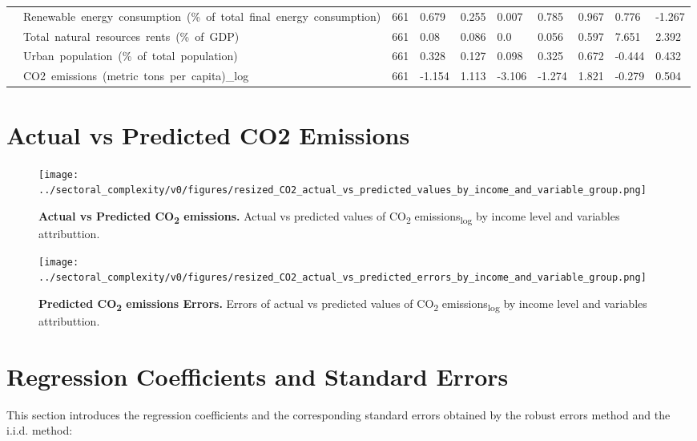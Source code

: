 \begin{appendices}
\begin{table}[H]
\begin{adjustbox}{width=\textwidth,center}
\begin{tabular}{llllllllll}
	 & Renewable\ energy\ consumption\ (\%\ of\ total\ final\ energy\ consumption) & 661 & 0.679 & 0.255 & 0.007 & 0.785 & 0.967 & 0.776 & -1.267 \\
	 & Total\ natural\ resources\ rents\ (\%\ of\ GDP) & 661 & 0.08 & 0.086 & 0.0 & 0.056 & 0.597 & 7.651 & 2.392 \\
	 & Urban\ population\ (\%\ of\ total\ population) & 661 & 0.328 & 0.127 & 0.098 & 0.325 & 0.672 & -0.444 & 0.432 \\
	 & CO2\ emissions\ (metric\ tons\ per\ capita)\_log & 661 & -1.154 & 1.113 & -3.106 & -1.274 & 1.821 & -0.279 & 0.504 \\
	\cline{1-10}
	\bottomrule
	\end{tabular}
	\end{adjustbox}
\end{table}

\newpage

\section{Actual vs Predicted CO2 Emissions}
\label{annex:actual-vs-predicted}

\begin{figure}[H]
	\centering
	\texttt{[image: ../sectoral\_complexity/v0/figures/resized\_CO2\_actual\_vs\_predicted\_values\_by\_income\_and\_variable\_group.png]}
	\caption{\textbf{Actual vs Predicted CO\textsubscript{2} emissions.} Actual vs predicted values of CO\textsubscript{2} emissions\textsubscript{log} by income level and variables attributtion.}
	\label{fig:actual-vs-predicted}
\end{figure}

\begin{figure}[H]
	\centering
	\texttt{[image: ../sectoral\_complexity/v0/figures/resized\_CO2\_actual\_vs\_predicted\_errors\_by\_income\_and\_variable\_group.png]}
	\caption{\textbf{Predicted CO\textsubscript{2} emissions Errors.} Errors of actual vs predicted values of CO\textsubscript{2} emissions\textsubscript{log} by income level and variables attributtion.}
	\label{fig:predicted-errors}
\end{figure}

\newpage

\section{Regression Coefficients and Standard Errors}
\label{annex:reg-coeffs-errors}
This section introduces the regression coefficients and the corresponding standard errors obtained by the robust errors method and the i.i.d. method:


\end{appendices}
